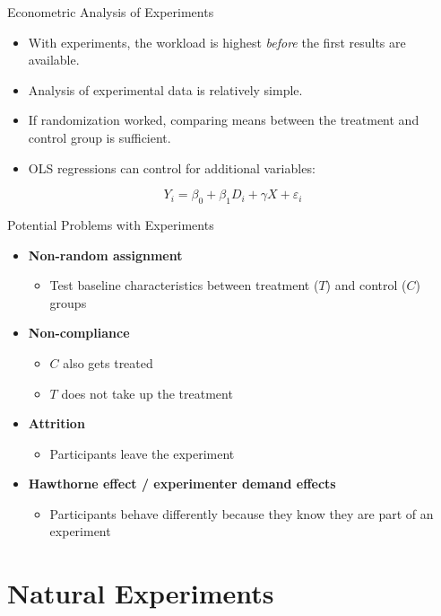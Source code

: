 \documentclass[11pt,aspectratio=169]{beamer}
\begin{document}
\begin{frame}{Econometric Analysis of Experiments}
  \begin{itemize}
    \item With experiments, the workload is highest \emph{before} the first results are available.
    \item Analysis of experimental data is relatively simple.
    \item If randomization worked, comparing means between the treatment and control group is sufficient.
    \item OLS regressions can control for additional variables:
  \end{itemize}
  \[
    Y_i = \beta_0 + \beta_1 D_i + \gamma X + \varepsilon_i \tag{1}
  \]
\end{frame}

\begin{frame}{Potential Problems with Experiments}
  \begin{itemize}
    \item \textbf{Non-random assignment}
    \begin{itemize}
      \item Test baseline characteristics between treatment ($T$) and control ($C$) groups
    \end{itemize}
    \item \textbf{Non-compliance}
    \begin{itemize}
      \item $C$ also gets treated
      \item $T$ does not take up the treatment
    \end{itemize}
    \item \textbf{Attrition}
    \begin{itemize}
      \item Participants leave the experiment
    \end{itemize}
    \item \textbf{Hawthorne effect / experimenter demand effects}
    \begin{itemize}
      \item Participants behave differently because they know they are part of an experiment
    \end{itemize}
  \end{itemize}
\end{frame}

\section{Natural Experiments}
\end{document}
